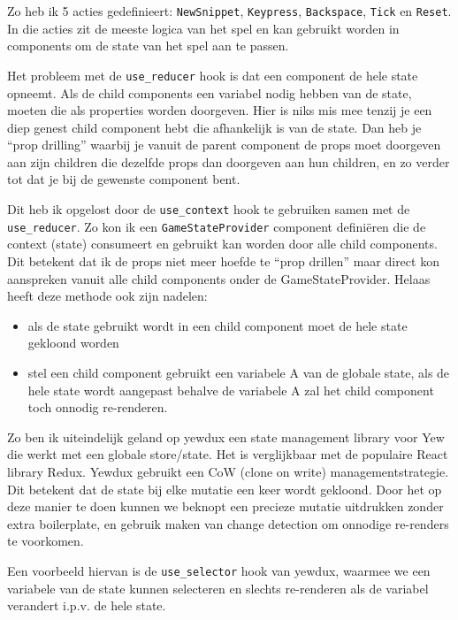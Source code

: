 Zo heb ik 5 acties gedefinieert: \texttt{NewSnippet}, \texttt{Keypress},
\texttt{Backspace}, \texttt{Tick} en \texttt{Reset}. In die acties zit
de meeste logica van het spel en kan gebruikt worden in components om de state van het spel aan te
passen. 

Het probleem met de \texttt{use_reducer} hook is dat een component de hele state opneemt.
Als de child components een variabel nodig hebben van de state, moeten die als properties worden
doorgeven. Hier is niks mis mee tenzij je een diep genest child component hebt die afhankelijk is
van de state. Dan heb je “prop drilling” waarbij je vanuit de parent component de props moet
doorgeven aan zijn children die dezelfde props dan doorgeven aan hun children, en zo verder tot dat
je bij de gewenste component bent.

Dit heb ik opgelost door de \texttt{use_context} hook te gebruiken samen met de
\texttt{use_reducer}. Zo kon ik een \texttt{GameStateProvider} component
definiëren die de context (state) consumeert en gebruikt kan worden door alle child components. Dit
betekent dat ik de props niet meer hoefde te “prop drillen” maar direct kon aanspreken vanuit alle
child components onder de GameStateProvider. Helaas heeft deze methode ook zijn nadelen: 
\begin{itemize}
    \item als de state gebruikt wordt in een child component moet de hele state gekloond worden 

    \item stel een child component gebruikt een variabele A van de globale state, als de hele state
    wordt aangepast behalve de variabele A zal het child component toch onnodig re-renderen. 
\end{itemize}

Zo ben ik uiteindelijk geland op yewdux een state management library voor Yew die werkt met een
globale store/state. Het is verglijkbaar met de populaire React library Redux. Yewdux gebruikt een
CoW (clone on write) managementstrategie. Dit betekent dat de state bij elke mutatie een keer wordt
gekloond. Door het op deze manier te doen kunnen we beknopt een precieze mutatie uitdrukken zonder
extra boilerplate, en gebruik maken van change detection om onnodige re-renders te voorkomen. 

Een voorbeeld hiervan is de \texttt{use_selector} hook van yewdux, waarmee we een
variabele van de state kunnen selecteren en slechts re-renderen als de variabel verandert i.p.v. de
hele state.

